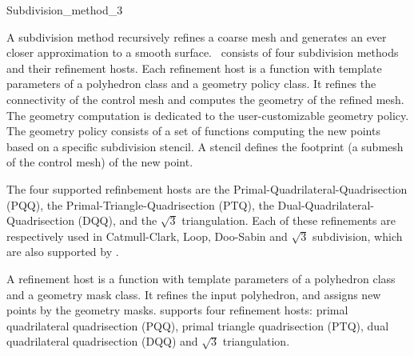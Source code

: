 
\ccRefPageBegin



\begin{ccRefClass}{Subdivision_method_3}

\ccDefinition

A subdivision method recursively refines a coarse mesh and 
generates an ever closer approximation to a smooth surface.
\ccClassTemplateName\ consists of four subdivision methods
and their refinement hosts. Each refinement host is a function 
with template parameters of a polyhedron class and a 
geometry policy class. It refines the connectivity of the
control mesh and computes the geometry of the refined mesh.
The geometry computation is dedicated to the user-customizable
geometry policy. The geometry policy consists of a set of functions 
computing the new points based on a specific subdivision stencil.
A stencil defines the footprint (a submesh of the control mesh)
of the new point.

The four supported refinbement hosts are the 
Primal-Quadrilateral-Quadrisection (PQQ),
the Primal-Triangle-Quadrisection (PTQ), 
the Dual-Quadrilateral-Quadrisection (DQQ), 
and the $\sqrt{3}$ triangulation.
Each of these refinements are respectively used in 
Catmull-Clark, Loop, Doo-Sabin and $\sqrt{3}$ subdivision, which
are also supported by \ccClassTemplateName .


A refinement host is a function with template parameters of 
a polyhedron class and a geometry mask class. It refines
the input polyhedron, and assigns new points by the geometry masks.
 supports four refinement hosts:
primal quadrilateral quadrisection (PQQ), 
primal triangle quadrisection (PTQ), dual quadrilateral 
quadrisection (DQQ) and $\sqrt{3}$ triangulation.


\end{ccRefClass}
